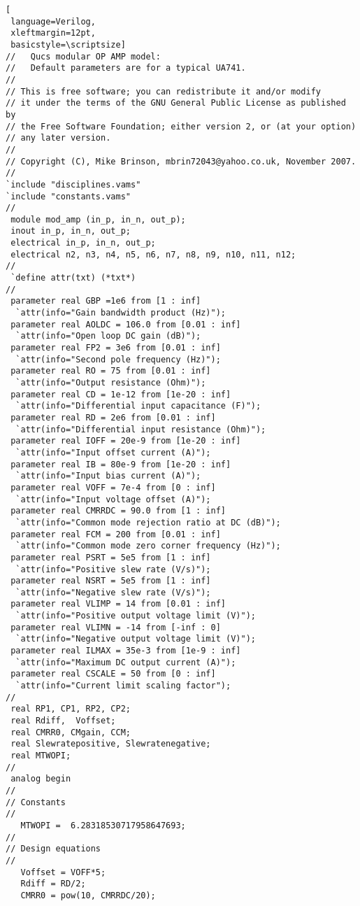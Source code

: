 \begin{lstlisting}[
 language=Verilog, 
 xleftmargin=12pt,
 basicstyle=\scriptsize]
//   Qucs modular OP AMP model:
//   Default parameters are for a typical UA741.
//
// This is free software; you can redistribute it and/or modify
// it under the terms of the GNU General Public License as published by
// the Free Software Foundation; either version 2, or (at your option)
// any later version.
// 
// Copyright (C), Mike Brinson, mbrin72043@yahoo.co.uk, November 2007.
//
`include "disciplines.vams"
`include "constants.vams"
// 
 module mod_amp (in_p, in_n, out_p);
 inout in_p, in_n, out_p;
 electrical in_p, in_n, out_p;
 electrical n2, n3, n4, n5, n6, n7, n8, n9, n10, n11, n12;
//   
 `define attr(txt) (*txt*)
//
 parameter real GBP =1e6 from [1 : inf]
  `attr(info="Gain bandwidth product (Hz)");
 parameter real AOLDC = 106.0 from [0.01 : inf] 
  `attr(info="Open loop DC gain (dB)");
 parameter real FP2 = 3e6 from [0.01 : inf]
  `attr(info="Second pole frequency (Hz)");
 parameter real RO = 75 from [0.01 : inf]
  `attr(info="Output resistance (Ohm)");
 parameter real CD = 1e-12 from [1e-20 : inf]
  `attr(info="Differential input capacitance (F)");
 parameter real RD = 2e6 from [0.01 : inf]
  `attr(info="Differential input resistance (Ohm)");
 parameter real IOFF = 20e-9 from [1e-20 : inf]
  `attr(info="Input offset current (A)");
 parameter real IB = 80e-9 from [1e-20 : inf]
  `attr(info="Input bias current (A)");
 parameter real VOFF = 7e-4 from [0 : inf]
  `attr(info="Input voltage offset (A)");
 parameter real CMRRDC = 90.0 from [1 : inf]
  `attr(info="Common mode rejection ratio at DC (dB)");
 parameter real FCM = 200 from [0.01 : inf]
  `attr(info="Common mode zero corner frequency (Hz)");
 parameter real PSRT = 5e5 from [1 : inf]
  `attr(info="Positive slew rate (V/s)");
 parameter real NSRT = 5e5 from [1 : inf]
  `attr(info="Negative slew rate (V/s)");
 parameter real VLIMP = 14 from [0.01 : inf]
  `attr(info="Positive output voltage limit (V)");
 parameter real VLIMN = -14 from [-inf : 0]
  `attr(info="Negative output voltage limit (V)");
 parameter real ILMAX = 35e-3 from [1e-9 : inf]
  `attr(info="Maximum DC output current (A)");
 parameter real CSCALE = 50 from [0 : inf]
  `attr(info="Current limit scaling factor");
// 
 real RP1, CP1, RP2, CP2;
 real Rdiff,  Voffset;
 real CMRR0, CMgain, CCM; 
 real Slewratepositive, Slewratenegative;
 real MTWOPI;
//
 analog begin
//
// Constants
//
   MTWOPI =  6.28318530717958647693;
//
// Design equations
//
   Voffset = VOFF*5;
   Rdiff = RD/2;
   CMRR0 = pow(10, CMRRDC/20);

\end{lstlisting}

